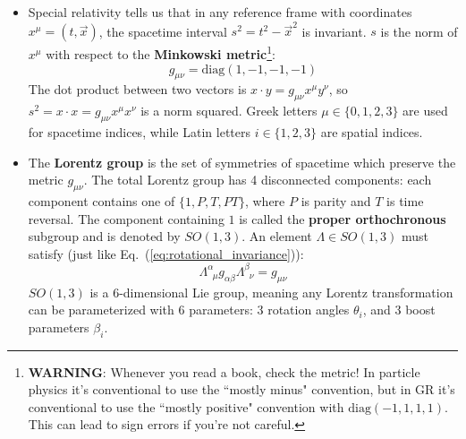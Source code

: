 \documentclass[12pt]{article}
\theoremstyle{mytheorem}
\begin{document}
\begin{itemize}
	\item Special relativity tells us that in any reference frame with coordinates $x^\mu = (t, \vec x)$, 
	the spacetime interval $s^2 = t^2 - \vec x^2$ is invariant. $s$ is the norm of $x^\mu$ with respect to 
	the \textbf{Minkowski metric}\footnote{\textbf{WARNING}: Whenever you read a book, check the metric! In particle physics it's conventional 
	to use the ``mostly minus" convention, but in GR it's conventional to use the ``mostly positive" convention with $\mathrm{diag}(-1, 1, 1, 1)$. 
	This can lead to sign errors if you're not careful.}:
	\begin{equation}
		g_{\mu\nu} = \mathrm{diag}(1, -1, -1, -1)
	\end{equation}
	The dot product between two vectors is $x\cdot y = g_{\mu\nu} x^\mu y^\nu$, so $s^2 = x\cdot x = 
	g_{\mu\nu} x^\mu x^\nu$ is a norm squared. Greek letters $\mu\in \{0, 
	1, 2, 3\}$ are used for spacetime indices, while Latin letters $i\in \{1, 2, 3\}$ are spatial indices.
	
	\item The \textbf{Lorentz group} is the set of symmetries of spacetime which preserve the metric $g_{\mu\nu}$. 
	The total Lorentz group has 4 disconnected components: each component contains one of $\{1, P, T, PT\}$, where $P$ 
	is parity and $T$ is time reversal. The component containing $1$ is called the \textbf{proper orthochronous} subgroup 
	and is denoted by $SO(1, 3)$. An element $\Lambda\in SO(1, 3)$ must satisfy (just like 
	Eq.~(\ref{eq:rotational_invariance})):
	\begin{equation}
		\Lambda^\alpha_{\;\;\mu} g_{\alpha\beta} \Lambda^\beta_{\;\;\nu} = g_{\mu\nu}
		\label{eq:lorentz_metric_invariance}
	\end{equation}
	$SO(1, 3)$ is a 6-dimensional Lie group, meaning any Lorentz transformation can be 
	parameterized with 6 parameters: 3 rotation angles $\theta_i$, and 3 boost parameters $\beta_i$. 
	

\end{itemize}
\end{document}
